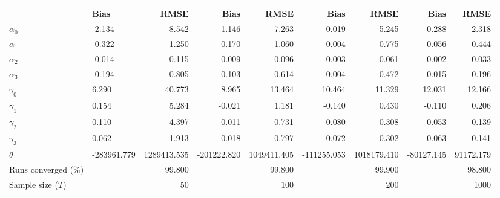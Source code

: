 
\begin{tabular}[t]{llrrrrrrr}
\toprule
  & Bias & RMSE & Bias & RMSE & Bias & RMSE & Bias & RMSE\\
\midrule
$\alpha_{0}$ & -2.134 & 8.542 & -1.146 & 7.263 & 0.019 & 5.245 & 0.288 & 2.318\\
$\alpha_{1}$ & -0.322 & 1.250 & -0.170 & 1.060 & 0.004 & 0.775 & 0.056 & 0.444\\
$\alpha_{2}$ & -0.014 & 0.115 & -0.009 & 0.096 & -0.003 & 0.061 & 0.002 & 0.033\\
$\alpha_{3}$ & -0.194 & 0.805 & -0.103 & 0.614 & -0.004 & 0.472 & 0.015 & 0.196\\
$\gamma_{0}$ & 6.290 & 40.773 & 8.965 & 13.464 & 10.464 & 11.329 & 12.031 & 12.166\\
$\gamma_{1}$ & 0.154 & 5.284 & -0.021 & 1.181 & -0.140 & 0.430 & -0.110 & 0.206\\
$\gamma_{2}$ & 0.110 & 4.397 & -0.011 & 0.731 & -0.080 & 0.308 & -0.053 & 0.139\\
$\gamma_{3}$ & 0.062 & 1.913 & -0.018 & 0.797 & -0.072 & 0.302 & -0.063 & 0.141\\
$\theta$ & -283961.779 & 1289413.535 & -201222.820 & 1049411.405 & -111255.053 & 1018179.410 & -80127.145 & 91172.179\\
Runs converged (\%) &  & 99.800 &  & 99.800 &  & 99.900 &  & 98.800\\
Sample size ($T$) &  & 50 &  & 100 &  & 200 &  & 1000\\
\bottomrule
\end{tabular}
